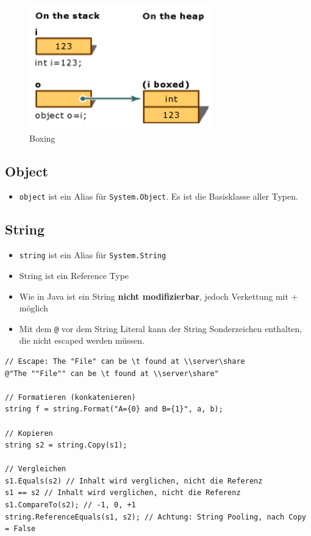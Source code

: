 \documentclass[
a4paper,
oneside,
10pt,
fleqn,
headsepline,
toc=listofnumbered, 
bibliography=totocnumbered]{scrartcl}
\begin{document}
\begin{figure}[h!]
\centering
\includegraphics[width=0.4\linewidth]{images/boxing}
\caption{Boxing}
\label{fig:boxing}
\end{figure}



\subsection{Object}
\begin{itemize}
	\item \lstinline|object| ist ein Alias für \lstinline|System.Object|. Es ist die Basisklasse aller Typen.
\end{itemize}

\subsection{String}
\begin{itemize}
	\item \lstinline|string| ist ein Alias für \lstinline|System.String|
	\item String ist ein Reference Type
	\item Wie in Java ist ein String \textbf{nicht modifizierbar}, jedoch Verkettung mit + möglich
	\item Mit dem \lstinline|@| vor dem String Literal kann der String Sonderzeichen enthalten, die nicht escaped werden müssen.
\end{itemize}
\begin{lstlisting}
// Escape: The "File" can be \t found at \\server\share
@"The ""File"" can be \t found at \\server\share"

// Formatieren (konkatenieren)
string f = string.Format("A={0} and B={1}", a, b);

// Kopieren
string s2 = string.Copy(s1);

// Vergleichen
s1.Equals(s2) // Inhalt wird verglichen, nicht die Referenz
s1 == s2 // Inhalt wird verglichen, nicht die Referenz
s1.CompareTo(s2); // -1, 0, +1 
string.ReferenceEquals(s1, s2); // Achtung: String Pooling, nach Copy = False
\end{lstlisting}
\end{document}
